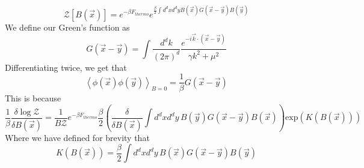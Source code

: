 \[
	\mathcal{ Z  } [ B ( \vec{x} ) ] = e^{  - \beta F_{ thermo }} e^{ \frac{\beta}{2} \int d^ d x d^ d y  B ( \vec{x} ) G ( \vec{x} - \vec{y} ) B ( \vec{y} )  } 
\]  We define our Green's function as 
\[
	G ( \vec{x} - \vec{y} ) = \int \frac{ d ^ d k }{ ( 2 \pi ) ^ d } \frac{e^{  - i \vec{k} \cdot ( \vec{x} - \vec{y} ) }}{\gamma k^ 2 + \mu ^ 2 } 
\] Differentiating twice, we get that
\[
	\left< \phi ( \vec{x} ) \phi ( \vec{y} )  \right>_{ B = 0 } = \frac{1}{\beta } G ( \vec{x} - \vec{y} )	
\]This is because
\[\frac{1}{\beta } \frac{\delta \log \mathcal{ Z}}{\delta B ( \vec{x} ) } =  \frac{1}{ B \mathcal{ Z } }e^{  - \beta F_{ thermo } } \frac{\beta}{2 } \left(  \frac{ \delta }{ \delta B ( \vec{x} ) } \int d^ d x d^ d y \, B ( \vec{y} ) G( \vec{x} - \vec{y} ) B ( \vec{x} )   \right) \text{exp} ( K ( B ( \vec{x} ) ) )  \]
Where we have defined for brevity that 
\[
	K ( B ( \vec{x} ) ) = \frac{\beta  }{2 }\int d^ d x d^ d y \, B ( \vec{x} ) G ( \vec{x} - \vec{y} ) B ( \vec{y} ) 
\] 
